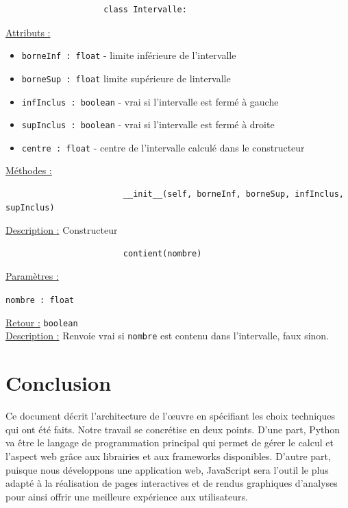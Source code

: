 \begin{itemize}
				\begin{lstlisting}
					class Intervalle:
				\end{lstlisting}
				\underline{Attributs :}
					\begin{itemize}
						\item \lstinline!borneInf : float! - limite inférieure de l'intervalle
						\item \lstinline!borneSup : float! limite supérieure de lintervalle
						\item \lstinline!infInclus : boolean! - vrai si l'intervalle est fermé à gauche
						\item \lstinline!supInclus : boolean! - vrai si l'intervalle est fermé à droite
						\item \lstinline!centre : float! - centre de l'intervalle calculé dans le constructeur
					\end{itemize}
				\underline{Méthodes :}
					\begin{lstlisting}
						__init__(self, borneInf, borneSup, infInclus, supInclus)
					\end{lstlisting}
					\underline{Description :} Constructeur
						
					\vspace{1em}
					\begin{lstlisting}
						contient(nombre)
					\end{lstlisting}
					\underline{Paramètres :}
						\begin{description}[style=unboxed,leftmargin=0.2cm]
							\item \lstinline!nombre : float!
						\end{description}
					\underline{Retour :} \lstinline!boolean!\\
					\underline{Description :} Renvoie vrai si \lstinline!nombre! est contenu dans l'intervalle, faux sinon.
				
 		\end{itemize}
	
	\section*{Conclusion}
		Ce document décrit l'architecture de l'œuvre en spécifiant les choix techniques qui ont été faits. Notre travail se concrétise en deux points. D'une part, Python va être le langage de programmation principal qui permet de gérer le calcul et l'aspect web grâce aux librairies et aux frameworks disponibles. D'autre part, puisque nous développons une application web, JavaScript sera l'outil le plus adapté à la réalisation de pages interactives et de rendus graphiques d'analyses pour ainsi offrir une meilleure expérience aux utilisateurs.
